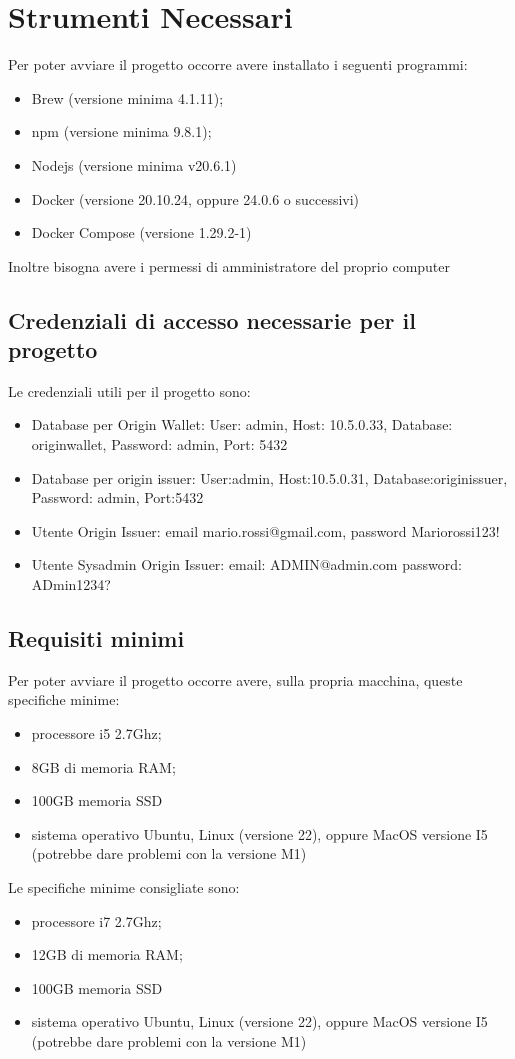 \section{Strumenti Necessari}
Per poter avviare il progetto occorre avere installato i seguenti programmi:
\begin{itemize}
   \item  Brew (versione minima 4.1.11);
   \item  npm (versione minima 9.8.1);
   \item  Nodejs (versione minima v20.6.1)
   \item  Docker (versione 20.10.24, oppure 24.0.6 o successivi)
   \item Docker Compose (versione 1.29.2-1)
\end{itemize}
Inoltre bisogna avere i permessi di amministratore del proprio computer



\subsection{Credenziali di accesso necessarie per il progetto}
Le credenziali utili per il progetto sono:
\begin{itemize}
   \item Database per Origin Wallet: User: admin, Host: 10.5.0.33, Database: originwallet, Password: admin, Port: 5432
   \item Database per origin issuer: User:admin, Host:10.5.0.31, Database:originissuer, Password: admin, Port:5432
   \item Utente Origin Issuer: email mario.rossi@gmail.com, password Mariorossi123!
   \item Utente Sysadmin Origin Issuer: email: ADMIN@admin.com password: ADmin1234?
\end{itemize}

\subsection{Requisiti minimi}
Per poter avviare il progetto occorre avere, sulla propria macchina, queste specifiche minime:
\begin{itemize}
   \item processore i5 2.7Ghz;
   \item 8GB di memoria RAM;
   \item 100GB memoria SSD
   \item sistema operativo Ubuntu, Linux (versione 22), oppure MacOS versione I5 (potrebbe dare problemi con la versione M1)
\end{itemize}
Le specifiche minime consigliate sono:
\begin{itemize}
   \item processore i7 2.7Ghz;
   \item 12GB di memoria RAM;
   \item 100GB memoria SSD
   \item sistema operativo Ubuntu, Linux (versione 22), oppure MacOS versione I5 (potrebbe dare problemi con la versione M1)
\end{itemize}

